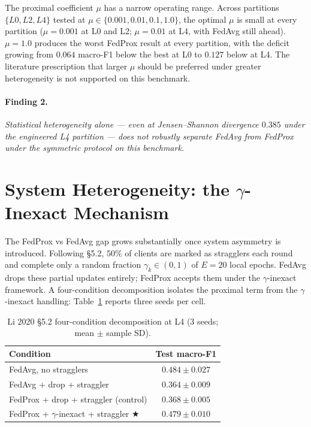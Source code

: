 \documentclass[11pt,a4paper]{report}
\begin{document}
The proximal coefficient $\mu$ has a narrow operating range. Across partitions
$\{L0, L2, L4\}$ tested at $\mu \in \{0.001, 0.01, 0.1, 1.0\}$, the optimal
$\mu$ is small at every partition ($\mu = 0.001$ at L0 and L2; $\mu = 0.01$
at L4, with FedAvg still ahead). $\mu = 1.0$ produces the worst FedProx
result at every partition, with the deficit growing from $0.064$ macro-F1
below the best at L0 to $0.127$ below at L4. The literature prescription
that larger $\mu$ should be preferred under greater heterogeneity
\citep{li2020fedprox} is not supported on this benchmark.

\paragraph{Finding 2.}
\textit{Statistical heterogeneity alone --- even at Jensen--Shannon
divergence $0.385$ under the engineered L4 partition --- does not robustly
separate FedAvg from FedProx under the symmetric protocol on this
benchmark.}

\section{System Heterogeneity: the $\gamma$-Inexact Mechanism}
\label{sec:cond-system-het}

The FedProx vs FedAvg gap grows substantially once system asymmetry is
introduced. Following \citet{li2020fedprox} §5.2, $50\%$ of clients are
marked as stragglers each round and complete only a random fraction
$\gamma_k \in (0, 1)$ of $E = 20$ local epochs. FedAvg drops these partial
updates entirely; FedProx accepts them under the $\gamma$-inexact framework.
A four-condition decomposition isolates the proximal term from the
$\gamma$-inexact handling: Table~\ref{tab:cond-li2020} reports three seeds
per cell.

\begin{table}[!htbp]
\centering
\caption{Li 2020 §5.2 four-condition decomposition at L4 (3 seeds; mean
$\pm$ sample SD).}
\label{tab:cond-li2020}
\small
\begin{tabular}{lc}
\toprule
Condition                                            & Test macro-F1 \\
\midrule
FedAvg, no stragglers                                & $0.484 \pm 0.027$ \\
FedAvg + drop + straggler                            & $0.364 \pm 0.009$ \\
FedProx + drop + straggler (control)                 & $0.368 \pm 0.005$ \\
FedProx + $\gamma$-inexact + straggler $\bigstar$    & $\mathbf{0.479 \pm 0.010}$ \\
\bottomrule
\end{tabular}
\end{table}
\end{document}
